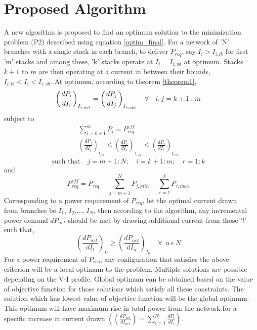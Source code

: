 \documentclass[twocolumn]{autart}
\begin{document}
\section{Proposed Algorithm}
\label{algorithm}
A new algorithm is proposed to find an optimum solution to the minimization problem (P2) described using equation \eqref{optim_final}. 
For a network of 'N' branches with a single stack in each branch, to deliver $P_{req}$, say $ I_i > I_{i,lb}$ for first 'm' stacks and among these, 'k' stacks operate at $ I_i = I_{i,ub}$ at optimum. Stacks $k+1$ to $m$ are then operating at a current in between their bounds, $I_{i,lb} < I_i < I_{i,ub}$. At optimum, according to theorem \ref{theorem1},
\begin{equation}
\label{equaldpdi}
\left(\frac{dP_{i}}{dI_i}\right)_{I_{i,opt}} = \left(\frac{dP_{j}}{dI_j}\right)_{I_{j,opt}}  \quad \forall \quad i,j =k+1:m\\
\end{equation}
subject to
\begin{subequations}
\label{allcondnskkt}
\begin{gather}
\label{preq}
\sum_{i=k+1}^{m}P_{i}=P_{req}^{eff}\\
\label{inequaldpdi}
 \left(\frac{dP_{j}}{dI_j}\right)_{_{I_{j,lb}}} \leq \left(\frac{dP_{i}}{dI_i}\right)_{_{I_{i,opt}}} \leq \left(\frac{dP_{r}}{dI_r}\right)_{_{I_{r,ub}}} 
\end{gather}
\end{subequations}
\begin{equation*}
\label{dpdimax}
\text{such that} \quad j=m+1:N;\quad i=k+1:m;\quad  r=1:k
\end{equation*}
and
\begin{equation}
\label{effectv_power}
P_{req}^{eff} = P_{req} - \sum_{j=m+1}^{N} P_{j,min} - \sum_{r=1}^k P_{r,max} 
\end{equation}
Corresponding to a power requirement of $P_{req}$, let the optimal current drawn from branches be $I_1$, $I_2$,...,  $I_N$, then according to the algorithm, any incremental power demand $dP_{net}$ should be met by drawing additional current from those '$l$' such that,
\begin{equation}
\left(\frac{dP_{net}}{dI_l}\right)_{I_l} \geq \left(\frac{dP_{net}}{dI_n}\right)_{I_n} \quad \forall \ \ n \ \epsilon \ N
\end{equation}
For a power requirement of $P_{req}$, any configuration that satisfies the above criterion will be a local optimum to the problem. Multiple solutions are possible depending on the V-I profile. Global optimum can be obtained based on the value of objective function for those solutions which satisfy all these constraints. The solution which has lowest value of objective function will be the global optimum. This optimum will have maximum rise in total power from the network for a specific increase in current drawn $\left(\left( \frac{dP_{net}}{dI_{net}} \right ) = \sum_{i=1}^{N}  \frac{dP_{i}}{dI_i}\right)$. 
\end{document}
